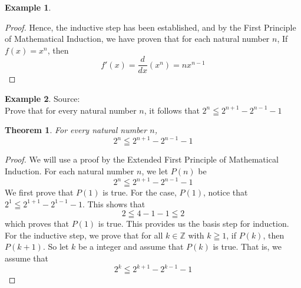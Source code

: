 \documentclass{book}
\newtheorem{theorem}{Theorem}[section]
\theoremstyle{definition}
\newtheorem{example}{Example}[definition]
\theoremstyle{remark}
\newcommand{\bb}[1]{\mathbb{#1}}
\begin{document}
\begin{example}
\begin{proof}
        
        Hence, the inductive step has been established, and by the First Principle of Mathematical Induction, we have proven that for each natural number $n$, If $f(x) = x^n$, then
            \begin{equation*}
                f'(x) = \frac{d}{dx}(x^n) = nx^{n-1}
            \end{equation*} 
    \end{proof}
\end{example}





\newpage
\begin{example}
Source: \cite[C.10]{Hammack} \\ 

Prove that for every natural number $n$, it follows that  $2^n \leqq 2^{n+1} - 2^{n-1} - 1$ 
\begin{tcolorbox}
    \begin{theorem}
        For every natural number $n$,
        \begin{equation*}
            2^n \leqq 2^{n+1} - 2^{n-1} - 1              
        \end{equation*}
    \end{theorem}
\end{tcolorbox}

\begin{proof}
    We will use a proof by the Extended First Principle of Mathematical Induction. For each natural number $n$, we let $P(n)$ be
        \begin{equation*}
            2^n \leqq 2^{n+1} - 2^{n-1} - 1 
        \end{equation*}
    We first prove that $P(1)$ is true. For the case, $P(1)$, notice that $2^1 \leqq 2^{1+1} - 2^{1-1} - 1$. This shows that   
        \begin{equation*}
            2 \leqq 4-1-1 \leqq 2
        \end{equation*}
    which proves that $P(1)$ is true. This provides us the basis step for induction. \\ 
    
    For the inductive step, we prove that for all $k \in \bb{Z}$ with $k \geqq 1$, if $P(k)$, then $P(k+1)$. So let $k$ be a integer and assume that $P(k)$ is true. That is, we assume that 
        \begin{equation*}
            2^k \leqq 2^{k+1} - 2^{k-1} - 1 
        \end{equation*}
    

\end{proof}
\end{example}
\end{document}
